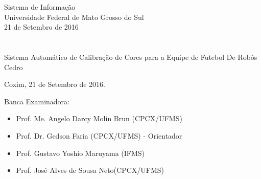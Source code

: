\vskip 0.5cm
\begin{center}
Sistema de Informação\\
Universidade Federal de Mato Grosso do Sul\\
21 de Setembro de 2016
\end{center}


\chapter*{}

\begin{center}

\begin{minipage}[t]{10cm}
	\begin{center}
		\vspace{-2cm}
		{{\Large Sistema Automático de Calibração de Cores para a Equipe de Futebol De Robôs Cedro}}  
	\end{center}
\end{minipage}

\end{center}


\begin{flushright}
	\vspace{12cm}
	Coxim, 21 de Setembro de 2016.
\end{flushright}

\vspace{2cm}
Banca Examinadora:

\begin{itemize}
	\item Prof. Me. Angelo Darcy Molin Brun (CPCX/UFMS) 
	\item Prof. Dr. Gedson Faria (CPCX/UFMS) - Orientador
	\item Prof. Gustavo Yoshio Maruyama (IFMS)
	\item Prof. José Alves de Sousa Neto(CPCX/UFMS)
\end{itemize}
